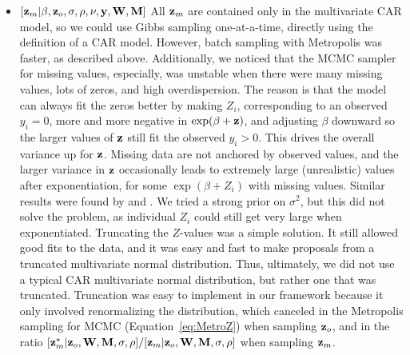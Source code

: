 \documentclass[11pt, titlepage]{article}
\begin{document}
\begin{spacing}{1.9}
\begin{flushleft}
\begin{itemize}
  \item $[\mathbf{z}_{m}|\beta,\mathbf{z}_{o},\sigma,\rho,\nu,\mathbf{y},\mathbf{W},\mathbf{M}]$ All $\mathbf{z}_{m}$ are contained only in the multivariate CAR model, so we could use Gibbs sampling one-at-a-time, directly using the definition of a CAR model. However, batch sampling with Metropolis was faster, as described above.  Additionally, we noticed that the MCMC sampler for missing values, especially, was unstable when there were many missing values, lots of zeros, and high overdispersion.  The reason is that the model can always fit the zeros better by making $Z_{i}$, corresponding to an observed $y_{i} = 0$, more and more negative in $\exp(\beta + \mathbf{z})$, and adjusting $\beta$ downward so the larger values of $\mathbf{z}$ still fit the observed $y_{i} > 0$.  This drives the overall variance up for $\mathbf{z}$.  Missing data are not anchored by observed values, and the larger variance in $\mathbf{z}$ occasionally leads to extremely large (unrealistic) values after exponentiation, for some $\exp(\beta + Z_{i})$ with missing values.  Similar results were found by \citet{conn_using_2015} and \citet{higham_spatial_2019}. We tried a strong prior on $\sigma^{2}$, but this did not solve the problem, as individual $Z_{i}$ could still get very large when exponentiated.  Truncating the $Z$-values was a simple solution.  It still allowed good fits to the data, and it was easy and fast to make proposals from a truncated multivariate normal distribution.  Thus, ultimately, we did not use a typical CAR multivariate normal distribution, but rather one that was truncated.  Truncation was easy to implement in our framework because it only involved renormalizing the distribution, which canceled in the Metropolis sampling for MCMC (Equation~\ref{eq:MetroZ}) when sampling $\mathbf{z}_{o}$, and in the ratio $[\mathbf{z}_{m}^{*}|\mathbf{z}_{o},\mathbf{W},\mathbf{M},\sigma,\rho]/[\mathbf{z}_{m}|\mathbf{z}_{o},\mathbf{W},\mathbf{M},\sigma,\rho]$ when sampling $\mathbf{z}_{m}$.

\end{itemize}
\end{flushleft}
\end{spacing}
\end{document}
